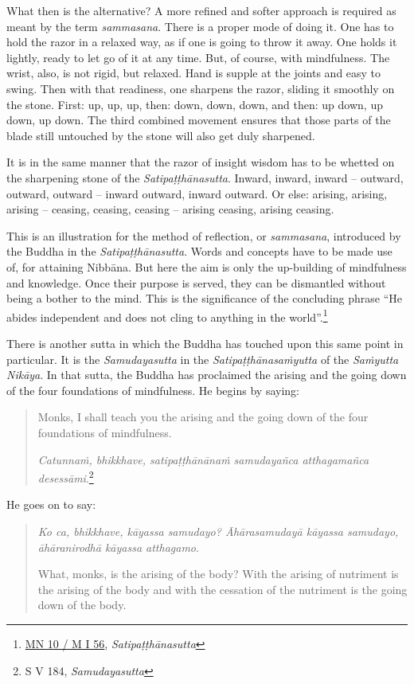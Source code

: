What then is the alternative? A more refined and softer approach is required as meant by the term \emph{sammasana}. There is a proper mode of doing it. One has to hold the razor in a relaxed way, as if one is going to throw it away. One holds it lightly, ready to let go of it at any time. But, of course, with mindfulness. The wrist, also, is not rigid, but relaxed. Hand is supple at the joints and easy to swing. Then with that readiness, one sharpens the razor, sliding it smoothly on the stone. First: up, up, up, then: down, down, down, and then: up down, up down, up down. The third combined movement ensures that those parts of the blade still untouched by the stone will also get duly sharpened.

It is in the same manner that the razor of insight wisdom has to be whetted on the sharpening stone of the \emph{Satipaṭṭhānasutta}. Inward, inward, inward -- outward, outward, outward -- inward outward, inward outward. Or else: arising, arising, arising -- ceasing, ceasing, ceasing -- arising ceasing, arising ceasing.

This is an illustration for the method of reflection, or \emph{sammasana}, introduced by the Buddha in the \emph{Satipaṭṭhānasutta}. Words and concepts have to be made use of, for attaining Nibbāna. But here the aim is only the up-building of mindfulness and knowledge. Once their purpose is served, they can be dismantled without being a bother to the mind. This is the significance of the concluding phrase ``He abides independent and does not cling to anything in the world''.\footnote{\href{https://suttacentral.net/mn10/pli/ms}{MN 10 / M I 56}, \emph{Satipaṭṭhānasutta}}

There is another sutta in which the Buddha has touched upon this same point in particular. It is the \emph{Samudayasutta} in the \emph{Satipaṭṭhānasaṁyutta} of the \emph{Saṁyutta Nikāya}. In that sutta, the Buddha has proclaimed the arising and the going down of the four foundations of mindfulness. He begins by saying:

\begin{quote}
Monks, I shall teach you the arising and the going down of the four foundations of mindfulness.

\emph{Catunnaṁ, bhikkhave, satipaṭṭhānānaṁ samudayañca atthagamañca desessāmi}.\footnote{S V 184, \emph{Samudayasutta}}
\end{quote}

He goes on to say:

\begin{quote}
\emph{Ko ca, bhikkhave, kāyassa samudayo? Āhārasamudayā kāyassa samudayo, āhāranirodhā kāyassa atthagamo}.

What, monks, is the arising of the body? With the arising of nutriment is the arising of the body and with the cessation of the nutriment is the going down of the body.
\end{quote}

